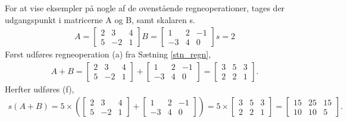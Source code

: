 \begin{eks}
For at vise eksempler på nogle af de ovenstående regneoperationer, tages der udgangspunkt i matricerne A og B, samt skalaren s.
\begin{align*}
A= \begin{bmatrix}
	2 & 3 & 4 \\
	5 & -2 & 1 	
\end{bmatrix}  
B= \begin{bmatrix}
	1 & 2 & -1 \\
	-3 & 4 & 0
\end{bmatrix}  
s=2
\end{align*}
Først udføres regneoperation (a) fra Sætning \ref{stn_regn},
\begin{align*}
A+B= \begin{bmatrix}
	2 & 3 & 4 \\
	5 & -2 & 1 	
\end{bmatrix}  
+ \begin{bmatrix}
	1 & 2 & -1 \\
	-3 & 4 & 0
\end{bmatrix}
= \begin{bmatrix}
	3 & 5 & 3 \\
	2 & 2 & 1
\end{bmatrix}.
\end{align*}
Herfter udføres (f),
\begin{align*}
s(A+B)= 5 \times \left( \begin{bmatrix}
	2 & 3 & 4 \\
	5 & -2 & 1 	
\end{bmatrix}  
+ \begin{bmatrix}
	1 & 2 & -1 \\
	-3 & 4 & 0
\end{bmatrix} \right)
= 5 \times \begin{bmatrix}
	3 & 5 & 3 \\
	2 & 2 & 1
\end{bmatrix}
= \begin{bmatrix}
	15 & 25 & 15 \\
	10 & 10 & 5
\end{bmatrix}.
\end{align*}
\end{eks}



